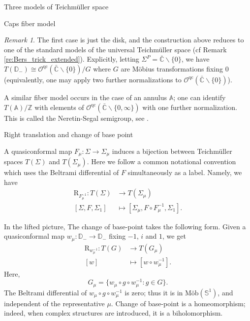 \documentclass[12pt]{amsart}
\newcommand{\disk}{\ensuremath{\mathbb{D}} } %
\newcommand{\sphere}{\bar{\Bbb{C}}} %
\newcommand{\riem}{\Sigma}  %
\renewcommand{\Bbb}[1]{\ensuremath{\mathbb{#1}}}
\theoremstyle{plain}
\theoremstyle{definition}
\theoremstyle{remark}
\newtheorem{remark}[theorem]{Remark}
\numberwithin{equation}{section} %
\numberwithin{figure}{section} %
\begin{document}
\begin{section}{Three models of Teichm\"uller space}
\begin{subsection}{Caps fiber model}
\begin{remark}
  The first case is just the disk, and the construction above reduces to one of the standard models of the universal Teichm\"uller space (cf Remark \ref{re:Bers_trick_extended}). Explicitly, letting $\riem^P = \sphere \backslash \{0 \}$, we have 
  $T(\disk_-) \cong \mathcal{O}^{\mathrm{qc}}(\sphere \backslash \{0 \})/G$ where $G$ are M\"obius transformations fixing $0$ (equivalently, one may apply two further normalizations to $\mathcal{O}^{\mathrm{qc}}(\sphere \backslash \{0 \})$). 

  A similar fiber model occurs in the case of an annulus $\mathbb{A}$; one can identify $T(\mathbb{A})/\mathbb{Z}$ with elements of $\mathcal{O}^{\mathrm{qc}}(\sphere \backslash \{0,\infty\})$ with one further normalization. This is called the Neretin-Segal semigroup, see \cite{RadnellSchippers_annulus}. 
\end{remark}
 
 \end{subsection} 
\begin{subsection}{Right translation and change of base point}

 A quasiconformal map $F_\mu:\riem \rightarrow \riem_\mu$ induces a bijection between Teichm\"uller spaces $T(\riem)$ and $T(\riem_\mu)$. Here we follow a common notational convention which uses the Beltrami differential of $F$ simultaneously as a label. 
 Namely, we have
 \begin{align*}
  \mathrm{R}_{F_\mu^{-1}}: T(\riem) & \rightarrow T(\riem_\mu) \\
  [\riem,F,\riem_1] & \mapsto [\riem_\mu,F \circ F_\mu^{-1},\riem_1].
 \end{align*} 
 
 In the lifted picture, The change of base-point takes the following form. Given a quasiconformal map $w_\mu:\disk_- \rightarrow \disk_-$ fixing $-1$, $i$ and $1$, we get 
 \begin{align*}
  \mathrm{R}_{w_\mu^{-1}}: T(G) & \rightarrow T(G_\mu) \\
  [w] & \mapsto [w \circ w_\mu^{-1}].
 \end{align*}
 Here, 
 \begin{equation} \label{eq:change_base_point_def_group}
  G_\mu = \{  w_\mu \circ g \circ w_\mu^{-1}  : g \in G   \}. 
 \end{equation}
 The Beltrami differential of $w_\mu \circ g \circ w_\mu^{-1}$ is zero; thus it is in $\text{M\"ob}(\mathbb{S}^1)$, and independent of the representative $\mu$. 
 Change of base-point is a homeomorphism; indeed, when complex structures are introduced, it is a biholomorphism. 
\end{subsection}
\end{section}
\end{document}
